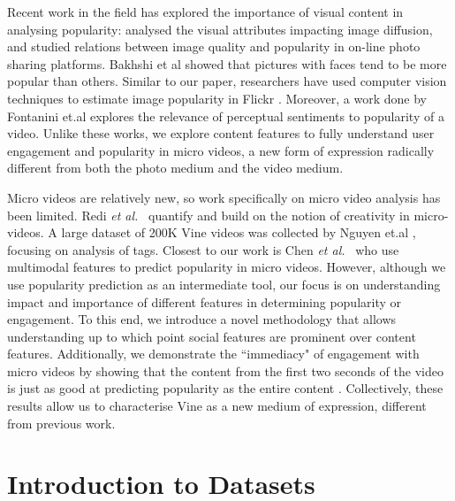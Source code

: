 Recent work in the field has explored the importance of visual content in analysing popularity: \cite{totti14impact} analysed the visual attributes impacting image diffusion,  and \cite{schifanella2015image} studied relations between image quality and popularity in on-line photo sharing platforms.  Bakhshi et al  \cite{bakhshi2014faces} showed that pictures with faces tend to be more popular than others. Similar to our paper, researchers have used computer vision techniques to estimate image popularity in Flickr \cite{Khosla:2014}. Moreover, a work done by Fontanini et.al \cite{fontanini2016web} explores the relevance of perceptual sentiments to popularity of a video. 
Unlike these works, we  explore content features to fully understand user engagement and popularity in micro videos, a new form of expression radically different from both the photo medium and the video medium.%

Micro videos are relatively new, so work specifically on micro video analysis has been limited. Redi \textsl{et al.}~\cite{redi20146} quantify and build on the notion of creativity in micro-videos. A large dataset of 200K Vine videos was collected by Nguyen et.al \cite{nguyen2016open}, focusing on analysis of tags. Closest to our work is Chen \textsl{et al.}~\cite{Chen:2016:MTM:2964284.2964314} who use multimodal features to predict popularity in micro videos. However, although we use popularity prediction as an intermediate tool, our focus is on understanding impact and importance of different features in determining popularity or engagement. To this end, we introduce a novel methodology 
that allows understanding up to which point social features are prominent over content features. Additionally, we demonstrate the ``immediacy" of engagement with micro videos by showing that the content from the first two seconds of the video is just as good at predicting  popularity as the entire content 
. Collectively, these results allow us to characterise Vine as a new medium of expression, different from previous work.




\section{Introduction to Datasets}

